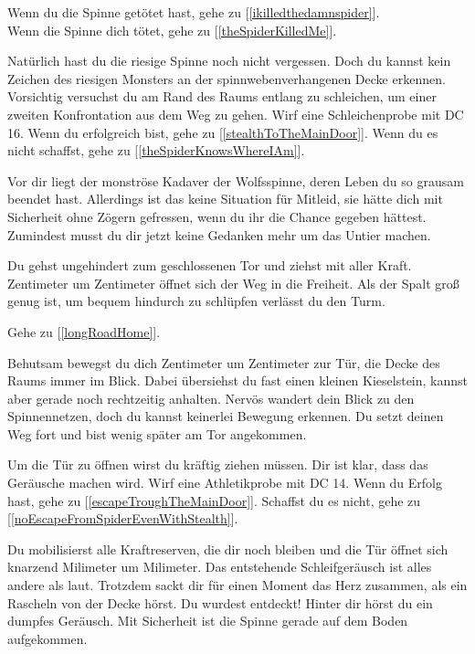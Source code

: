 
Wenn du die Spinne getötet hast, gehe zu [\ref{ikilledthedamnspider}].
\\Wenn die Spinne dich tötet, gehe zu [\ref{theSpiderKilledMe}].


Natürlich hast du die riesige Spinne noch nicht vergessen. Doch du kannst kein Zeichen des riesigen Monsters an der spinnwebenverhangenen Decke erkennen. Vorsichtig versuchst du am Rand des Raums entlang zu schleichen, um einer zweiten Konfrontation aus dem Weg zu gehen. Wirf eine Schleichenprobe mit DC 16. Wenn du erfolgreich bist, gehe zu [\ref{stealthToTheMainDoor}].
Wenn du es nicht schaffst, gehe zu [\ref{theSpiderKnowsWhereIAm}].


Vor dir liegt der monströse Kadaver der Wolfsspinne, deren Leben du so grausam beendet hast. Allerdings ist das keine Situation für Mitleid, sie hätte dich mit Sicherheit ohne Zögern gefressen, wenn du ihr die Chance gegeben hättest. Zumindest musst du dir jetzt keine Gedanken mehr um das Untier machen.

Du gehst ungehindert zum geschlossenen Tor und ziehst mit aller Kraft. Zentimeter um Zentimeter öffnet sich der Weg in die Freiheit. Als der Spalt groß genug ist, um bequem hindurch zu schlüpfen verlässt du den Turm.

Gehe zu [\ref{longRoadHome}].


Behutsam bewegst du dich Zentimeter um Zentimeter zur Tür, die Decke des Raums immer im Blick. Dabei übersiehst du fast einen kleinen Kieselstein, kannst aber gerade noch rechtzeitig anhalten. Nervös wandert dein Blick zu den Spinnennetzen, doch du kannst keinerlei Bewegung erkennen.
Du setzt deinen Weg fort und bist wenig später am Tor angekommen.

Um die Tür zu öffnen wirst du kräftig ziehen müssen. Dir ist klar, dass das Geräusche machen wird. Wirf eine Athletikprobe mit DC 14. Wenn du Erfolg hast, gehe zu [\ref{escapeTroughTheMainDoor}]. Schaffst du es nicht, gehe zu [\ref{noEscapeFromSpiderEvenWithStealth}].


Du mobilisierst alle Kraftreserven, die dir noch bleiben und die Tür öffnet sich knarzend Milimeter um Milimeter. Das entstehende Schleifgeräusch ist alles andere als laut. Trotzdem sackt dir für einen Moment das Herz zusammen, als ein Rascheln von der Decke hörst. Du wurdest entdeckt! Hinter dir hörst du ein dumpfes Geräusch. Mit Sicherheit ist die Spinne gerade auf dem Boden aufgekommen.

